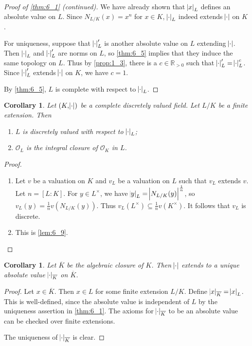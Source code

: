 \documentclass[11pt]{article}
\theoremstyle{definition}
\theoremstyle{plain}
\newtheorem{corollary}[definition]{Corollary}
\theoremstyle{remark}
\newcommand{\RR}{\mathbb{R}}
\newcommand{\cO}{\mathcal{O}}
\begin{document}
\begin{proof}[Proof of \autoref{thm:6_1} (continued)]
    We have already shown that $\abs{x}_L$ defines an absolute value on $L$. Since $N_{L/K}(x) = x^n$ for $x \in K$, $\abs{\cdot}_L$ indeed extends $\abs{\cdot}$ on $K$.

    For uniqueness, suppose that $\abs{\cdot}'_L$ is another absolute value on $L$ extending $\abs{\cdot}$. Then $\abs{\cdot}_L$ and $\abs{\cdot}'_L$ are norms on $L$, so \autoref{thm:6_5} implies that they induce the same topology on $L$. Thus by \autoref{prop:1_3}, there is a $c \in \RR_{>0}$ such that $\abs{\cdot}'_L = \abs{\cdot}_L^c$. Since $\abs{\cdot}'_L$ extends $\abs{\cdot}$ on $K$, we have $c = 1$.

    By \autoref{thm:6_5}, $L$ is complete with respect to $\abs{\cdot}_L$.
\end{proof}

\begin{corollary}\label{cor:6_10}
    Let $(K, \abs{\cdot})$ be a complete discretely valued field. Let $L / K$ be a finite extension. Then
    \begin{enumerate}
        \item $L$ is discretely valued with respect to $\abs{\cdot}_L$;
        \item $\cO_L$ is the integral closure of $\cO_K$ in $L$.
    \end{enumerate}
\end{corollary}
\begin{proof}\phantom{}
    \begin{enumerate}
        \item Let $v$ be a valuation on $K$ and $v_L$ be a valuation on $L$ such that $v_L$ extends $v$. Let $n = [L : K]$. For $y \in L^\times$, we have $\abs{y}_L = \abs{N_{L/K}(y)}^\frac{1}{n}$, so $v_L(y) = \frac{1}{n} v(N_{L/K}(y))$. Thus $v_L(L^\times) \subseteq \frac{1}{n} v(K^\times)$. It follows that $v_L$ is discrete.

        \item This is \autoref{lem:6_9}.\qedhere
    \end{enumerate}
\end{proof}

\begin{corollary}\label{cor:6_11}
    Let $\overline{K}$ be the algebraic closure of $K$. Then $\abs{\cdot}$ extends to a unique absolute value $\abs{\cdot}_{\overline{K}}$ on $\overline{K}$.
\end{corollary}
\begin{proof}
    Let $x \in \overline{K}$. Then $x \in L$ for some finite extension $L/K$. Define $\abs{x}_{\overline{K}} = \abs{x}_L$. This is well-defined, since the absolute value is independent of $L$ by the uniqueness assertion in \autoref{thm:6_1}. The axioms for $\abs{\cdot}_{\overline{K}}$ to be an absolute value can be checked over finite extensions.

    The uniqueness of $\abs{\cdot}_{\overline{K}}$ is clear.
\end{proof}
\end{document}
